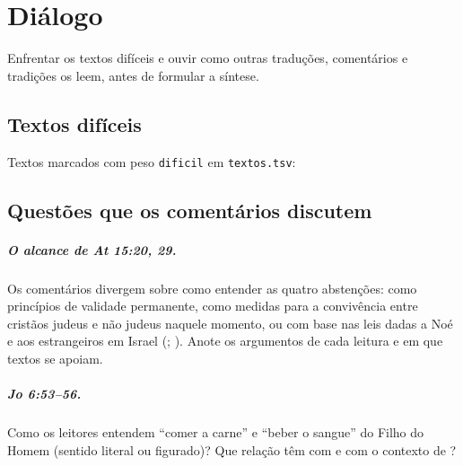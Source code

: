 \chapter{Diálogo}

\begin{objetivo}
Enfrentar os textos difíceis e ouvir como outras traduções, comentários e
tradições os leem, antes de formular a síntese.
\end{objetivo}

\section{Textos difíceis}
Textos marcados com peso \texttt{dificil} em \texttt{textos.tsv}:

\textosdotema[peso=dificil]

\section{Questões que os comentários discutem}

\paragraph{O alcance de At 15:20, 29.} Os comentários divergem sobre como
entender as quatro abstenções: como princípios de validade permanente, como
medidas para a convivência entre cristãos judeus e não judeus naquele
momento, ou com base nas leis dadas a Noé e aos estrangeiros em Israel
(; ). Anote os argumentos de cada leitura e em que
textos se apoiam.

\paragraph{Jo 6:53–56.} Como os leitores entendem \enquote{comer a carne} e
\enquote{beber o sangue} do Filho do Homem (sentido literal ou figurado)? Que
relação têm com  e com o contexto de ?


